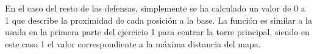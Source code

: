 En el caso del resto de las defensas, simplemente se ha calculado un valor de 0 a 1 que describe la proximidad de cada posición a la base. La función es similar a la usada en la primera parte del ejercicio 1 para centrar la torre principal, siendo en este caso 1 el valor correspondiente a la máxima distancia del mapa.
